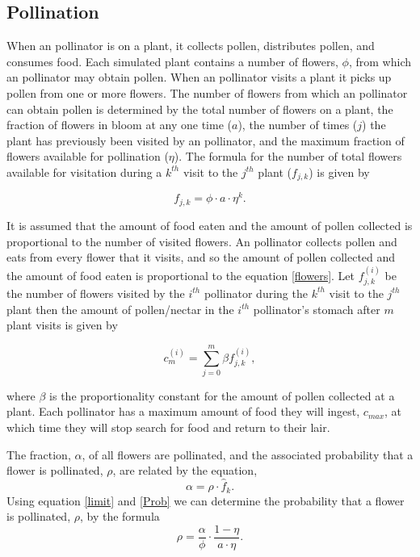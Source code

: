 \subsection{Pollination}
When an pollinator is on a plant, it collects pollen, distributes pollen, and
consumes food. Each simulated plant contains a number of flowers, $\phi$, from
which an pollinator may obtain pollen. When an pollinator visits a plant it
picks up pollen from one or more flowers. The number of flowers from which an
pollinator can obtain pollen is determined by the total number of flowers on a
plant, the fraction of flowers in bloom at any one time ($a$), the number of
times ($j$) the plant has previously been visited by an pollinator, and the
maximum fraction of flowers available for pollination ($\eta$). The formula for
the number of total flowers available for visitation during a $k^{th}$ visit to
the $j^{th}$ plant ($f_{j,k}$) is given by

\begin{equation}\label{flowers}
f_{j,k} = \phi \cdot a \cdot \eta^k.
\end{equation}

It is assumed that the amount of food eaten and the amount of pollen collected
is proportional to the number of visited flowers. An pollinator collects pollen
and eats from every flower that it visits, and so the amount of pollen collected
and the amount of food eaten is proportional to the equation \eqref{flowers}.
Let $f^{\left(i\right)}_{j,k}$ be the number of flowers visited by the $i^{th}$
pollinator during the $k^{th}$ visit to the $j^{th}$ plant then the amount of
pollen/nectar in the $i^{th}$ pollinator's stomach after $m$ plant visits is
given by

\begin{equation}
c^{\left(i\right)}_m = \sum_{j=0}^{m} \beta f^{\left(i\right)}_{j,k},
\label{limit}
\end{equation}

where $\beta$ is the proportionality constant for the amount of pollen collected
at a plant.  Each pollinator has a maximum amount of food they will ingest,
$c_{max}$, at which time they will stop search for food and return to their
lair. %

The fraction, $\alpha$, of all flowers are pollinated, and the associated
probability that a flower is pollinated, $\rho$, are related by the equation,
\begin{equation} \label{Prob} \alpha = \rho \cdot \hat{f}_k.  \end{equation}
Using equation \eqref{limit} and \eqref{Prob} we can determine the probability
that a flower is pollinated, $\rho$, by the formula
\[
  \rho = \frac{\alpha}{\phi} \cdot \frac{1 - \eta}{a \cdot \eta}.
\]

